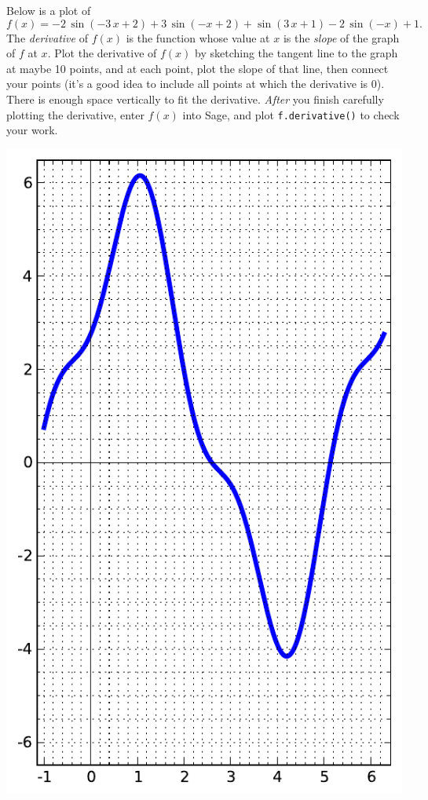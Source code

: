 Below is a plot of $$f(x)=-2 \, \sin\left(-3 \, x + 2\right) + 3 \, \sin\left(-x + 2\right) + \sin\left(3 \, x + 1\right) - 2 \, \sin\left(-x\right) + 1.$$  The {\em \color{red}derivative} of $f(x)$ is the function whose value at $x$ is the {\em slope} of the graph of $f$ at $x$.  Plot the derivative of $f(x)$ by sketching the tangent line to the graph at maybe 10 points, and at each point, plot the slope of that line, then connect your points (it's a good idea to include all points at which the derivative is 0).  There is enough space vertically to fit the derivative.  {\em After} you finish carefully plotting the derivative, enter $f(x)$ into Sage, and plot {\color{blue}\verb|f.derivative()|} to check your work.
\begin{center}\includegraphics{functions/11.pdf}\end{center}\newpage

